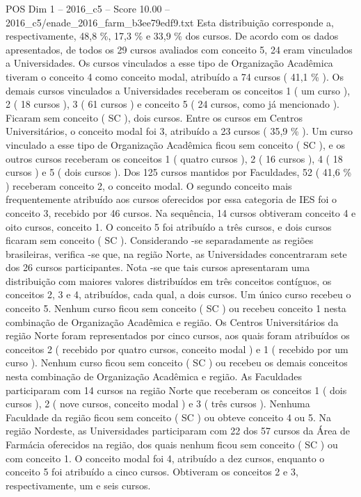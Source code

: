 \begin{textsample}{POS Dim 1 – 2016\_c5 – Score 10.00 – 2016\_c5/enade\_2016\_farm\_b3ee79edf9.txt}
Esta distribuição corresponde a, respectivamente, 48,8 \%, 17,3 \% e 33,9 \% dos cursos.
De acordo com os dados apresentados, de todos os 29 cursos avaliados com conceito 5, 24 eram vinculados a Universidades.
Os cursos vinculados a esse tipo de Organização Acadêmica tiveram o conceito 4 como conceito modal, atribuído a 74 cursos ( 41,1 \% ).
Os demais cursos vinculados a Universidades receberam os conceitos 1 ( um curso ), 2 ( 18 cursos ), 3 ( 61 cursos ) e conceito 5 ( 24 cursos, como já mencionado ).
Ficaram sem conceito ( SC ), dois cursos.
Entre os cursos em Centros Universitários, o conceito modal foi 3, atribuído a 23 cursos ( 35,9 \% ).
Um curso vinculado a esse tipo de Organização Acadêmica ficou sem conceito ( SC ), e os outros cursos receberam os conceitos 1 ( quatro cursos ), 2 ( 16 cursos ), 4 ( 18 cursos ) e 5 ( dois cursos ).
Dos 125 cursos mantidos por Faculdades, 52 ( 41,6 \% ) receberam conceito 2, o conceito modal.
O segundo conceito mais frequentemente atribuído aos cursos oferecidos por essa categoria de IES foi o conceito 3, recebido por 46 cursos.
Na sequência, 14 cursos obtiveram conceito 4 e oito cursos, conceito 1.
O conceito 5 foi atribuído a três cursos, e dois cursos ficaram sem conceito ( SC ).
Considerando -se separadamente as regiões brasileiras, verifica -se que, na região Norte, as Universidades concentraram sete dos 26 cursos participantes.
Nota -se que tais cursos apresentaram uma distribuição com maiores valores distribuídos em três conceitos contíguos, os conceitos 2, 3 e 4, atribuídos, cada qual, a dois cursos.
Um único curso recebeu o conceito 5.
Nenhum curso ficou sem conceito ( SC ) ou recebeu conceito 1 nesta combinação de Organização Acadêmica e região.
Os Centros Universitários da região Norte foram representados por cinco cursos, aos quais foram atribuídos os conceitos 2 ( recebido por quatro cursos, conceito modal ) e 1 ( recebido por um curso ).
Nenhum curso ficou sem conceito ( SC ) ou recebeu os demais conceitos nesta combinação de Organização Acadêmica e região.
As Faculdades participaram com 14 cursos na região Norte que receberam os conceitos 1 ( dois cursos ), 2 ( nove cursos, conceito modal ) e 3 ( três cursos ).
Nenhuma Faculdade da região ficou sem conceito ( SC ) ou obteve conceito 4 ou 5.
Na região Nordeste, as Universidades participaram com 22 dos 57 cursos da Área de Farmácia oferecidos na região, dos quais nenhum ficou sem conceito ( SC ) ou com conceito 1.
O conceito modal foi 4, atribuído a dez cursos, enquanto o conceito 5 foi atribuído a cinco cursos.
Obtiveram os conceitos 2 e 3, respectivamente, um e seis cursos.

\end{textsample}
